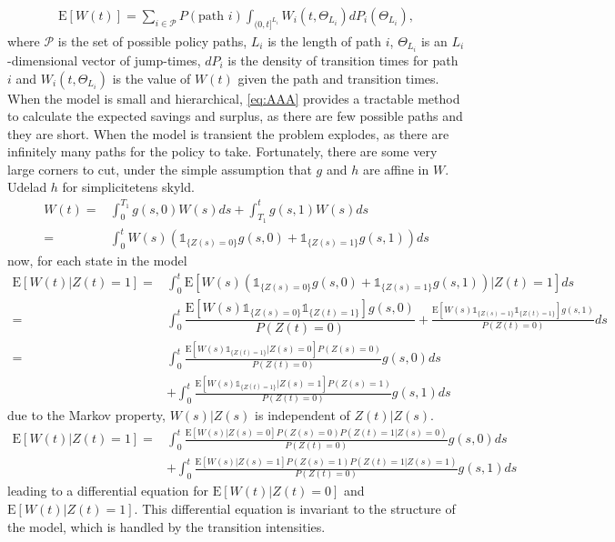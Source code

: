 \documentclass[12pt]{article}
\newcommand{\E}{\text{E}}
\newcommand{\indic}[1]{\mathds{1}_{ \{ #1 \} }}
\begin{document}
\begin{align}
\E[W(t)]= \sum_{i \in \mathcal{P}}  P(\text{path }i) \int_{(0,t]^{L_i}} W_i(t,\Theta_{L_i}) dP_i(\Theta_{L_i}),
\label{eq:AAA}
\end{align} 
where $\mathcal{P}$ is the set of possible policy paths, $L_i$ is the length of path $i$, $\Theta_{L_i}$ is an $L_i$-dimensional vector of jump-times, $dP_i$ is the density of transition times for path $i$ and $W_i(t,\Theta_{L_i})$ is the value of $W(t)$ given the path and transition times.
\\
When the model is small and hierarchical, \eqref{eq:AAA} provides a tractable method to calculate the expected savings and surplus, as there are few possible paths and they are short. When the model is transient the problem explodes, as there are infinitely many paths for the policy to take. Fortunately, there are some very large corners to cut, under the simple assumption that $g$ and $h$ are affine in $W$. Udelad $h$ for simplicitetens skyld.
\begin{align*}
W(t)=& \int_0^{T_1} g(s,0)W(s) ds + \int_{T_1}^t g(s,1) W(s) ds \\
=& \int_0^t W(s) \left( \indic{Z(s)=0} g(s,0) + \indic{Z(s)=1} g(s,1) \right) ds
\end{align*}
now, for each state in the model
\begin{align*}
\E[W(t)|Z(t)=1] %
=&
\int_0^t \E[ W(s) \left( \indic{Z(s)=0} g(s,0) + \indic{Z(s)=1} g(s,1) \right)|Z(t)=1] ds
\\
=&
\int_0^t \dfrac{\E[ W(s) \indic{Z(s)=0} \indic{Z(t)=1} ]g(s,0)}{P(Z(t)=0)} + \frac{\E [ W(s) \indic{Z(s)=1} \indic{Z(t)=1}  ]g(s,1)}{P(Z(t)=0)} ds
\\
=&
\int_0^t \frac{\E[ W(s) \indic{Z(t)=1}|Z(s)=0 ]P(Z(s)=0)}{P(Z(t)=0)} g(s,0) ds
\\
&+ \int_0^t \frac{\E [ W(s)  \indic{Z(t)=1} |Z(s)=1 ]P(Z(s)=1)}{P(Z(t)=0)} g(s,1) ds
\end{align*}
due to the Markov property, $W(s)|Z(s)$ is independent of $Z(t)|Z(s)$. 
\begin{align*}
\E[W(t)|Z(t)=1]
=&
\int_0^t \frac{\E[ W(s) |Z(s)=0 ]P(Z(s)=0)P(Z(t)=1|Z(s)=0)}{P(Z(t)=0)} g(s,0) ds
\\
&+ \int_0^t \frac{\E [ W(s) |Z(s)=1 ]P(Z(s)=1)P(Z(t)=1|Z(s)=1)}{P(Z(t)=0)} g(s,1) ds
\end{align*}
leading to a differential equation for $\E[W(t)|Z(t)=0]$ and $\E[W(t)|Z(t)=1]$. This differential equation is invariant to the structure of the model, which is handled by the transition intensities.
\end{document}
